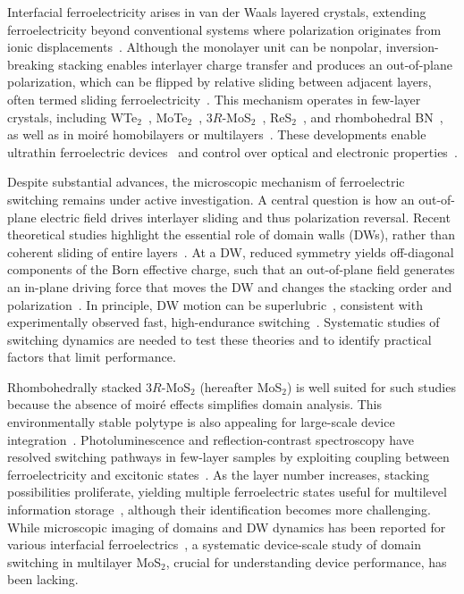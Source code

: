 \documentclass[
reprint,
superscriptaddress,









 amsmath,amssymb,
 aps,
 prb,






]{revtex4-2}
\begin{document}
Interfacial ferroelectricity arises in van der Waals layered crystals, extending ferroelectricity beyond conventional systems where polarization originates from ionic displacements~\cite{Wu2022}. Although the monolayer unit can be nonpolar, inversion-breaking stacking enables interlayer charge transfer and produces an out-of-plane polarization, which can be flipped by relative sliding between adjacent layers, often termed sliding ferroelectricity~\cite{Li2017}. This mechanism operates in few-layer crystals, including WTe$_2$~\cite{Fei2018,Xiao2020}, MoTe$_2$~\cite{Jindal2023}, 3$R$-MoS$_2$~\cite{Meng2022,Yang2022,Liang2022,Yang2024,Liang2025,Liang2025PRX,Ouyang2025}, ReS$_2$~\cite{Wan2022}, and rhombohedral BN~\cite{Wang2024}, as well as in moir\'{e} homobilayers or multilayers~\cite{Stern2021,Yasuda2021,Yasuda2024,McGilly2020,Wang2022,Weston2022,Deb2022,Ko2023,Winkle2024,Zheng2020}. These developments enable ultrathin ferroelectric devices~\cite{Li2024,Bian2024} and control over optical and electronic properties~\cite{Yang2022,Liang2022,Yang2024,Liang2025,Liang2025PRX,Ouyang2025,Niu2022,Klein2023,Chen2024}.

Despite substantial advances, the microscopic mechanism of ferroelectric switching remains under active investigation. A central question is how an out-of-plane electric field drives interlayer sliding and thus polarization reversal. Recent theoretical studies highlight the essential role of domain walls (DWs), rather than coherent sliding of entire layers~\cite{He2024,Wang2025,Ke2025,Shi2025}. At a DW, reduced symmetry yields off-diagonal components of the Born effective charge, such that an out-of-plane field generates an in-plane driving force that moves the DW and changes the stacking order and polarization~\cite{He2024,Wang2025,Ke2025,Shi2025}. In principle, DW motion can be superlubric~\cite{Ke2025}, consistent with experimentally observed fast, high-endurance switching~\cite{Yasuda2024,Bian2024,Bai2025}. Systematic studies of switching dynamics are needed to test these theories and to identify practical factors that limit performance.

Rhombohedrally stacked 3$R$-MoS$_2$ (hereafter MoS$_2$) is well suited for such studies because the absence of moir\'{e} effects simplifies domain analysis. This environmentally stable polytype is also appealing for large-scale device integration~\cite{Liu2025b}. Photoluminescence and reflection-contrast spectroscopy have resolved switching pathways in few-layer samples by exploiting coupling between ferroelectricity and excitonic states~\cite{Liang2022,Yang2024,Liang2025,Liang2025PRX,Ouyang2025}. As the layer number increases, stacking possibilities proliferate, yielding multiple ferroelectric states useful for multilevel information storage~\cite{Meng2022}, although their identification becomes more challenging. While microscopic imaging of domains and DW dynamics has been reported for various interfacial ferroelectrics~\cite{Deb2022,Weston2022,Ko2023,Winkle2024}, a systematic device-scale study of domain switching in multilayer MoS$_2$, crucial for understanding device performance, has been lacking.
\end{document}
